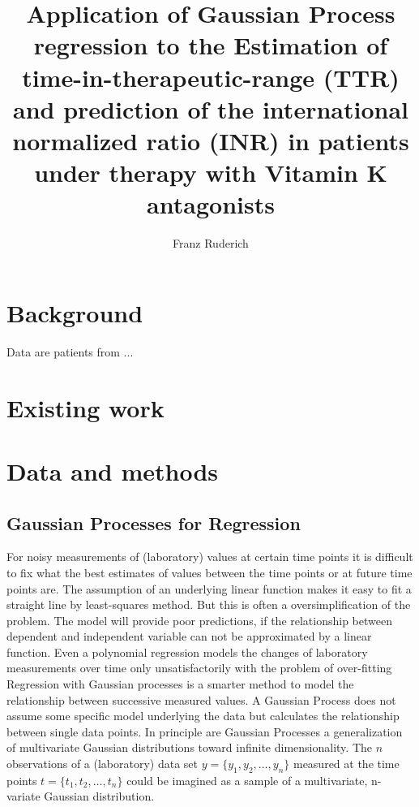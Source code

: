 \documentclass[12pt]{article}
\title{Application of Gaussian Process regression to the Estimation of time-in-therapeutic-range (TTR) and prediction of the international normalized ratio (INR) in patients under therapy with Vitamin K antagonists}
\author{Franz Ruderich}
\begin{document}
	\maketitle
	
	\clearpage
	\listoftodos
	
	\vspace{2\baselineskip}
	
	
	\clearpage
	
	\section{Background}
	Data are patients from ...
	\section{Existing work}
	
	\section{Data and methods}
	
	\subsection{Gaussian Processes for Regression}
	For noisy measurements of (laboratory) values at certain time points it is difficult to fix
	what the best estimates of values between the time points or at future time points are.
	The assumption of an underlying linear function makes it easy to fit a straight line by least-squares method. But this is often a oversimplification of the problem. The model will provide poor predictions, if the relationship between  dependent and independent variable can not be approximated by a linear function.
	Even a polynomial regression models the changes of laboratory measurements  over time only unsatisfactorily with the problem of over-fitting
	Regression with Gaussian processes is a smarter method to model the relationship between successive measured values. 
	A Gaussian Process does not assume some specific model underlying the data but calculates the relationship between single data points.
	In principle are Gaussian Processes a generalization of multivariate Gaussian distributions toward infinite dimensionality.
	The $n$ observations of a (laboratory) data set $y=\{y_{1},y_{2}, \ldots ,y_{n}\}$ measured at the time points $t=\{t_{1},t_{2}, \ldots ,t_{n}\}$ could be imagined as a sample of a multivariate, n-variate Gaussian distribution.
	
\end{document}

